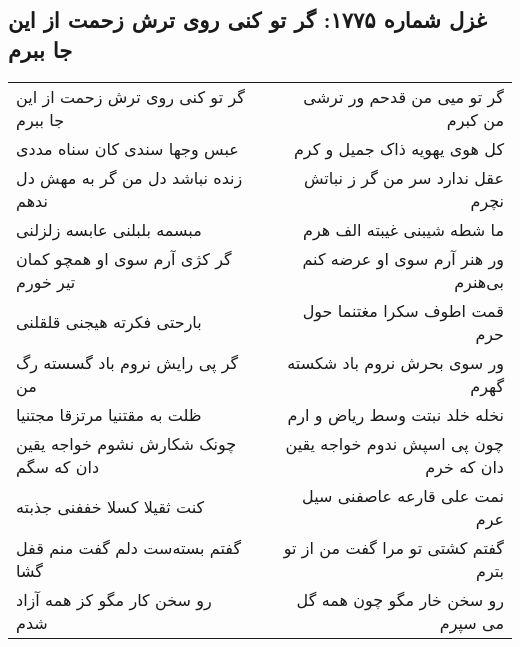 \begin{center}
\section*{غزل شماره ۱۷۷۵: گر تو کنی روی ترش زحمت از این جا ببرم}
\label{sec:1775}
\begin{longtable}{l p{0.5cm} r}
گر تو کنی روی ترش زحمت از این جا ببرم
&&
گر تو میی من قدحم ور ترشی من کبرم
\\
عبس وجها سندی کان سناه مددی
&&
کل هوی یهویه ذاک جمیل و کرم
\\
زنده نباشد دل من گر به مهش دل ندهم
&&
عقل ندارد سر من گر ز نباتش نچرم
\\
مبسمه بلبلنی عابسه زلزلنی
&&
ما شطه شیبنی غیبته الف هرم
\\
گر کژی آرم سوی او همچو کمان تیر خورم
&&
ور هنر آرم سوی او عرضه کنم بی‌هنرم
\\
بارحتی فکرته هیجنی قلقلنی
&&
قمت اطوف سکرا مغتنما حول حرم
\\
گر پی رایش نروم باد گسسته رگ من
&&
ور سوی بحرش نروم باد شکسته گهرم
\\
ظلت به مقتنیا مرتزقا مجتنیا
&&
نخله خلد نبتت وسط ریاض و ارم
\\
چونک شکارش نشوم خواجه یقین دان که سگم
&&
چون پی اسپش ندوم خواجه یقین دان که خرم
\\
کنت ثقیلا کسلا خففنی جذبته
&&
نمت علی قارعه عاصفنی سیل عرم
\\
گفتم بسته‌ست دلم گفت منم قفل گشا
&&
گفتم کشتی تو مرا گفت من از تو بترم
\\
رو سخن کار مگو کز همه آزاد شدم
&&
رو سخن خار مگو چون همه گل می سپرم
\\
\end{longtable}
\end{center}
